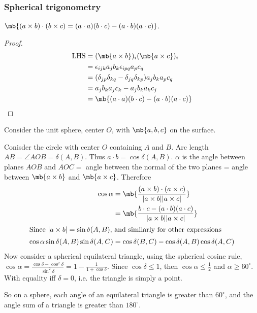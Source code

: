 \documentclass[a4paper]{article}
\begin{document}
\subsubsection{Spherical trigonometry}
\begin{prop}
  $\mb{(a\times b)\cdot (b\times c) = (a\cdot a)(b\cdot c) - (a\cdot b)(a\cdot c)}$.
\end{prop}
\begin{proof}
  \begin{align*}
    \text{LHS} &= (\mb{a\times b})_i(\mb{a\times c})_i\\
    &= \epsilon_{ijk}a_jb_k\epsilon_{ipq} a_pc_q\\
    &= (\delta_{jp}\delta_{kq} - \delta_{jq}\delta_{kp})a_jb_ka_pc_q\\
    &= a_jb_k a_jc_k - a_j b_k a_k c_j\\
    &= \mb{(a\cdot a)(b\cdot c) - (a\cdot b)(a\cdot c)}
  \end{align*}
\end{proof}

Consider the unit sphere, center $O$, with $\mb{a, b, c}$ on the surface.


Conisder the circle with center $O$ containing $A$ and $B$. Arc length $AB = \angle AOB = \delta(A, B)$. Thus $a\cdot b = \cos \delta(A, B)$. $\alpha$ is the angle between planes $AOB$ and $AOC = $ angle between the normal of the two planes = angle between $\mb{a\times b}$ and $\mb{a \times c}$. Therefore
\begin{align*}
  \cos \alpha &= \mb{\frac{(a\times b)\cdot(a\times c)}{|a\times b||a\times c|}}\\
  &= \mb{\frac{b\cdot c - (a\cdot b)(a\cdot c)}{|a\times b||a\times c|}}\\
\intertext{Since $|a\times b| = \sin\delta(A, B)$, and similarly for other expressions}
  \cos\alpha\sin\delta(A, B)\sin\delta(A, C) &= \cos\delta(B, C) - \cos\delta(A, B)\cos\delta(A, C)
\end{align*}
Now consider a spherical equilateral triangle, using the spherical cosine rule, $\cos\alpha = \frac{\cos\delta - \cos^2\delta}{\sin^2\delta} = 1 - \frac{1}{1 + \cos\delta}$. Since $\cos\delta\leq 1$, then $\cos\alpha\leq \frac{1}{2}$ and $\alpha \geq 60^\circ$. With equality iff $\delta = 0$, i.e. the triangle is simply a point.

So on a sphere, each angle of an equilateral triangle is greater than $60^\circ$, and the angle sum of a triangle is greater than $180^\circ$.
\end{document}
